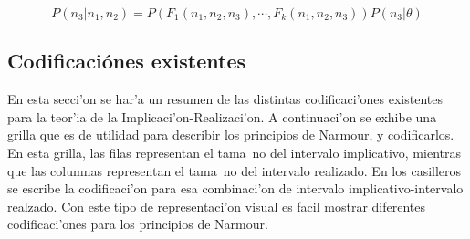 $$P(n_3 | n_1, n_2) = P(F_1(n_1, n_2, n_3), \cdots, F_k(n_1, n_2, n_3)) P(n_3|\theta)$$

\subsection{Codificaci\'ones existentes}
En esta secci'on se har'a un resumen de las distintas codificaci'ones existentes para la teor'ia de la Implicaci'on-Realizaci'on. A
continuaci'on se exhibe una grilla que es de utilidad para describir los principios de Narmour, y codificarlos. En esta grilla, las filas
representan el tama~no del intervalo implicativo, mientras que las columnas representan el tama~no del intervalo realizado. En los casilleros se 
escribe la codificaci'on para esa combinaci'on de intervalo implicativo-intervalo realzado. Con este tipo de representaci'on visual es facil mostrar diferentes codificaci'ones
para los principios de Narmour.

